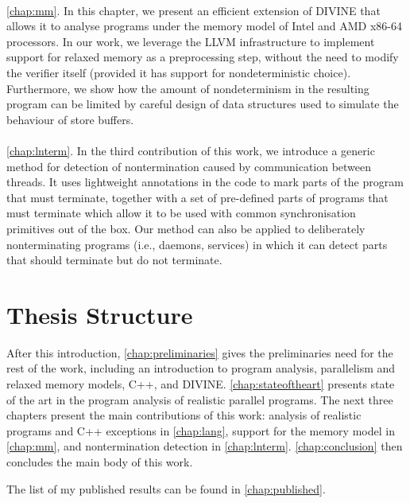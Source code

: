 \paragraph{}
\autoref{chap:mm}.
In this chapter, we present an efficient extension of DIVINE that allows it to
analyse programs under the memory model of Intel and AMD x86-64 processors.
In our work, we leverage the LLVM infrastructure to implement support for
relaxed memory as a preprocessing step, without the need to modify the verifier
itself (provided it has support for nondeterministic choice).
Furthermore, we show how the amount of nondeterminism in the resulting program
can be limited by careful design of data structures used to simulate the
behaviour of \xtso store buffers.

\paragraph{}
\autoref{chap:lnterm}.
In the third contribution of this work, we introduce a generic method for
detection of nontermination caused by communication between threads.
It uses lightweight annotations in the code to mark parts of the program that
must terminate, together with a set of pre-defined parts of programs that must
terminate which allow it to be used with common synchronisation primitives out
of the box.
Our method can also be applied to deliberately nonterminating programs (i.e.,
daemons, services) in which it can detect parts that should terminate but do
not terminate.

\section{Thesis Structure}

After this introduction, \autoref{chap:preliminaries} gives the preliminaries
need for the rest of the work, including an introduction to program analysis, parallelism and relaxed memory models, C++, and DIVINE.
\autoref{chap:stateoftheart} presents state of the art in the program analysis
of realistic parallel programs.
The next three chapters present the main contributions of this work: analysis of
realistic programs and C++ exceptions in \autoref{chap:lang}, support for the
\xtso memory model in \autoref{chap:mm}, and nontermination detection in
\autoref{chap:lnterm}.
\autoref{chap:conclusion} then concludes the main body of this work.

The list of my published results can be found in \autoref{chap:published}.

